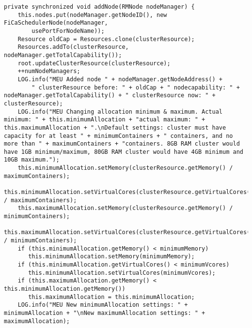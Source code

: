 \begin{lstlisting}
private synchronized void addNode(RMNode nodeManager) {
    this.nodes.put(nodeManager.getNodeID(), new FiCaSchedulerNode(nodeManager,
        usePortForNodeName));
    Resource oldCap = Resources.clone(clusterResource);
    Resources.addTo(clusterResource, nodeManager.getTotalCapability());
    root.updateClusterResource(clusterResource);
    ++numNodeManagers;
    LOG.info("MEU Added node " + nodeManager.getNodeAddress() +
        " clusterResource before: " + oldCap + " nodecapability: " + nodeManager.getTotalCapability() + " clusterResource now: " + clusterResource);
    LOG.info("MEU Changing allocation minimum & maximum. Actual minimum: " + this.minimumAllocation + "actual maximum: " + this.maximumAllocation + ".\nDefault settings: cluster must have capacity for at least " + minimumContainers + " containers, and no more than " + maximumContainers + "containers. 8GB RAM cluster would have 1GB minimum/maximum, 80GB RAM cluster would have 4GB minimum and 10GB maximum.");
    this.minimumAllocation.setMemory(clusterResource.getMemory() / maximumContainers);
    this.minimumAllocation.setVirtualCores(clusterResource.getVirtualCores() / maximumContainers);
    this.maximumAllocation.setMemory(clusterResource.getMemory() / minimumContainers);
    this.maximumAllocation.setVirtualCores(clusterResource.getVirtualCores() / minimumContainers);
    if (this.minimumAllocation.getMemory() < minimumMemory)
       this.minimumAllocation.setMemory(minimumMemory);
    if (this.minimumAllocation.getVirtualCores() < minimumVcores)
       this.minimumAllocation.setVirtualCores(minimumVcores);
    if (this.maximumAllocation.getMemory() < this.minimumAllocation.getMemory())
       this.maximumAllocation = this.minimumAllocation;
    LOG.info("MEU New minimumAllocation settings: " + minimumAllocation + "\nNew maximumAllocation settings: " + maximumAllocation);
\end{lstlisting}